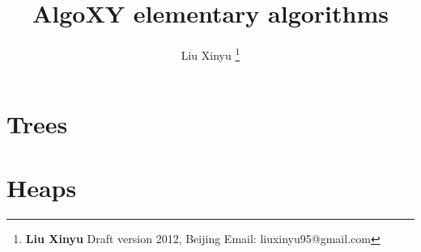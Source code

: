 \documentclass[a4paper,twoside]{book} %
\begin{document}


\title{{\bf \Huge AlgoXY} elementary algorithms
            }

\author{Liu Xinyu
  \thanks{{\bfseries Liu Xinyu } \newline
    Draft version 2012, Beijing \newline
    Email: liuxinyu95@gmail.com \newline
    }}

\maketitle


\tableofcontents
\newpage



\part{Trees}















\part{Heaps}

\end{document}
